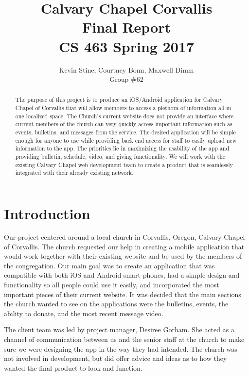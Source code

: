 \documentclass[letterpaper,10pt,draftclsnofoot,onecolumn,titlepage]{IEEEtran}
\def\name{Kevin Stine, Courtney Bonn, Maxwell Dimm}
\def\team{Calvary Chapel Corvallis}
\def\grp{Group \#62}
\begin{document}
	\title{\huge \team \\ Final Report\\ CS 463 Spring 2017}
	\author{\large \name \\ \grp}



	\maketitle

		\begin{abstract}The purpose of this project is to produce an iOS/Android application for Calvary Chapel of Corvallis that will allow members to access a plethora of information all in one localized space.
		The Church's current website does not provide an interface where current members of the church can very quickly access important information such as events, bulletins, and messages from the service.
		The desired application will be simple enough for anyone to use while providing back end access for staff to easily upload new information to the app.
		The priorities lie in maximizing the usability of the app and providing bulletin, schedule, video, and giving functionality.
		We will work with the existing Calvary Chapel web development team to create a product that is seamlessly integrated with their already existing network.
		\end{abstract}

		\clearpage
		
		\tableofcontents
		
		\clearpage

\section{Introduction}

Our project centered around a local church in Corvallis, Oregon, Calvary Chapel of Corvallis. 
The church requested our help in creating a mobile application that would work together with their existing website and be used by the members of the congregation. 
Our main goal was to create an application that was compatible with both iOS and Android smart phones, had a simple design and functionality so all people could use it easily, and incorporated the most important pieces of their current website.
It was decided that the main sections the church wanted to see on the applications were the bulletins, events, the ability to donate, and the most recent message video. 

The client team was led by project manager, Desiree Gorham. 
She acted as a channel of communication between us and the senior staff at the church to make sure we were designing the app in the way they had intended. 
The church was not involved in development, but did offer advice and ideas as to how they wanted the final product to look and function. 
\end{document}
